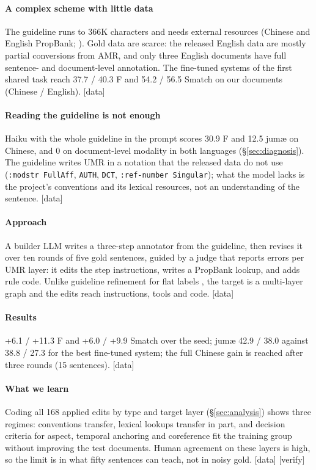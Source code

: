 \documentclass[11pt]{article}
\newcommand{\jumach}{ju\textlengthmark{}m\ae{}\textteshlig{}\xspace}
\newcommand{\stag}[2]{\textcolor{#1}{\textsf{\scriptsize[#2]}}}
\newcommand{\HAVE}{\stag{green!50!black}{data}\xspace}
\newcommand{\CHK}{\stag{orange!80!black}{verify}\xspace}
\begin{document}
\paragraph{A complex scheme with little data}
The guideline runs to 366K characters and needs external resources (Chinese and English PropBank; \citealp{xue2009adding,palmer2005propbank}). Gold data are scarce: the released English data are mostly partial conversions from AMR, and only three English documents have full sentence- and document-level annotation. The fine-tuned systems of the first shared task \citep{stepanek2026first,heinecke2026orange,devergnette2026sema} reach 37.7 / 40.3 F and 54.2 / 56.5 Smatch on our documents (Chinese / English). \HAVE

\paragraph{Reading the guideline is not enough}
Haiku with the whole guideline in the prompt scores 30.9 F and 12.5 \jumach on Chinese, and 0 on document-level modality in both languages (\S\ref{sec:diagnosis}). The guideline writes UMR in a notation that the released data do not use (\texttt{:modstr FullAff}, \texttt{AUTH}, \texttt{DCT}, \texttt{:ref-number Singular}); what the model lacks is the project's conventions and its lexical resources, not an understanding of the sentence. \HAVE

\paragraph{Approach}
A builder LLM writes a three-step annotator from the guideline, then revises it over ten rounds of five gold sentences, guided by a judge that reports errors per UMR layer: it edits the step instructions, writes a PropBank lookup, and adds rule code. Unlike guideline refinement for flat labels \citep{kim2026refining,kim2026diziner}, the target is a multi-layer graph and the edits reach instructions, tools and code. \HAVE

\paragraph{Results}
+6.1 / +11.3 F and +6.0 / +9.9 Smatch over the seed; \jumach 42.9 / 38.0 against 38.8 / 27.3 for the best fine-tuned system; the full Chinese gain is reached after three rounds (15 sentences). \HAVE

\paragraph{What we learn}
Coding all 168 applied edits by type and target layer (\S\ref{sec:analysis}) shows three regimes: conventions transfer, lexical lookups transfer in part, and decision criteria for aspect, temporal anchoring and coreference fit the training group without improving the test documents. Human agreement on these layers is high, so the limit is in what fifty sentences can teach, not in noisy gold. \HAVE{} \CHK
\end{document}

